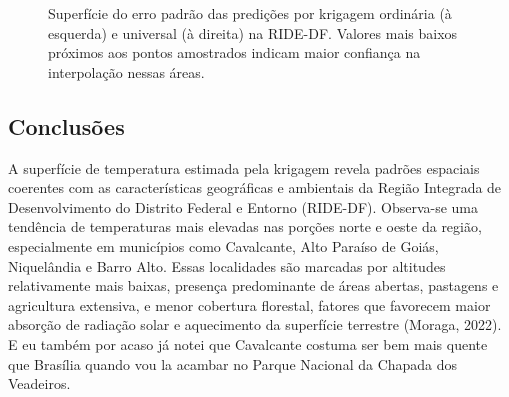 \documentclass[
  letterpaper,
  DIV=11,
  numbers=noendperiod]{scrartcl}
\begin{document}
\label{cell-fig-superficie-erro-padrao}
\begin{figure}[H]


\caption{\label{fig-superficie-erro-padrao}Superfície do erro padrão das
predições por krigagem ordinária (à esquerda) e universal (à direita) na
RIDE-DF. Valores mais baixos próximos aos pontos amostrados indicam
maior confiança na interpolação nessas áreas.}

\end{figure}%

\subsection{Conclusões}\label{conclusuxf5es}

A superfície de temperatura estimada pela krigagem revela padrões
espaciais coerentes com as características geográficas e ambientais da
Região Integrada de Desenvolvimento do Distrito Federal e Entorno
(RIDE-DF). Observa-se uma tendência de temperaturas mais elevadas nas
porções norte e oeste da região, especialmente em municípios como
Cavalcante, Alto Paraíso de Goiás, Niquelândia e Barro Alto. Essas
localidades são marcadas por altitudes relativamente mais baixas,
presença predominante de áreas abertas, pastagens e agricultura
extensiva, e menor cobertura florestal, fatores que favorecem maior
absorção de radiação solar e aquecimento da superfície terrestre
(Moraga, 2022). E eu também por acaso já notei que Cavalcante costuma
ser bem mais quente que Brasília quando vou la acambar no Parque
Nacional da Chapada dos Veadeiros.
\end{document}
